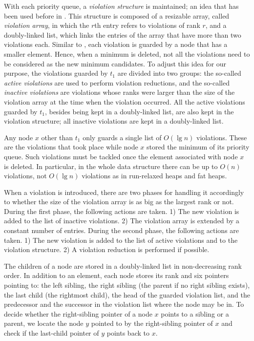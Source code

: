 \documentclass{llncs}
\begin{document}
With each priority queue, a \emph{violation structure} is maintained;
an idea that has been used before in \cite{Bro96,DGST88,KST02}. 
This structure is composed of a resizable array, called \emph{violation array}, in which the $r$th entry 
refers to violations of rank $r$, and a doubly-linked list, which links 
the entries of the array that have more than two violations each.  
Similar to \cite{Bro96}, each violation is guarded by a node that has a smaller element. 
Hence, when a minimum is deleted, not all the violations need to be considered 
as the new minimum candidates.  
To adjust this idea for our purpose, the violations guarded by $t_1$ 
are divided into two groups: the so-called \emph{active violations} are 
used to perform violation reductions, and the so-called \emph{inactive violations} 
are violations whose ranks were larger than the size of the violation array 
at the time when the violation occurred.  
All the active violations guarded by $t_1$, besides being kept in a doubly-linked list, 
are also kept in the violation structure; all inactive violations are kept in a doubly-linked list. 

Any node $x$ other than $t_1$ only guards a single 
list of $O(\lg n)$ violations. These are the violations that took place while 
node $x$ stored the minimum of its priority queue. Such violations must be 
tackled once the element associated with node $x$ is deleted.  
In particular, in the whole data structure there can be up to $O(n)$ violations, 
not $O(\lg n)$ violations as in run-relaxed heaps and fat heaps. 

When a violation is introduced, there are two phases for handling it accordingly to whether the size of the violation array is as big as the largest rank or not. During the first phase, the following actions are taken.
1) The new violation is added to the list of inactive violations.
2) The violation array is extended by a constant number of entries.
During the second phase, the following actions are taken.
1) The new violation is added to the list of active violations and to the violation structure.
2) A violation reduction is performed if possible.

The children of a node are stored in a doubly-linked list in
non-decreasing rank order. In addition to an element, each node stores
its rank and six pointers pointing to: the left sibling, the right
sibling (the parent if no right sibling exists), the last child (the rightmost child), 
the head of the guarded violation list, and the predecessor and the
successor in the violation list where the node may be in. 
To decide whether the right-sibling pointer of a node $x$ points to a sibling or a
parent, we locate the node $y$ pointed to by the right-sibling pointer of $x$ and check if the
last-child pointer of $y$ points back to $x$.
\end{document}
